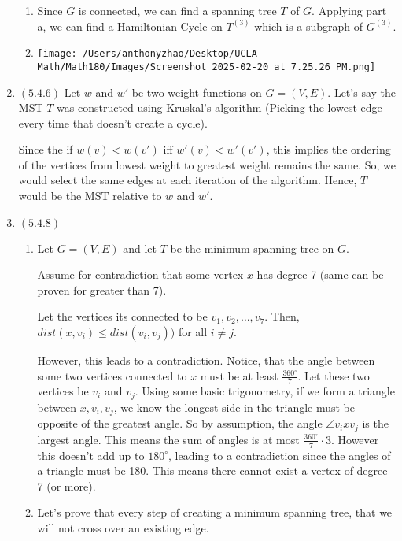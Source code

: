 \documentclass[12pt]{article}
\begin{document}
\begin{enumerate}[start=1,label={\bfseries Problem \arabic*:},leftmargin=1in]
\begin{enumerate}
        \item Since $G$ is connected, we can find a spanning tree $T$ of $G$. Applying part a, we can find a Hamiltonian Cycle on $T^{(3)}$ which is a subgraph of $G^{(3)}$.
        \item \texttt{[image: /Users/anthonyzhao/Desktop/UCLA-Math/Math180/Images/Screenshot 2025-02-20 at 7.25.26 PM.png]}
    \end{enumerate}
    
    \item $(5.4.6)$ Let $w$ and $w'$ be two weight functions on $G = (V, E)$. 
    Let's say the MST $T$ was constructed using Kruskal's algorithm (Picking the lowest edge every time that doesn't create a cycle). 

    Since the if $w(v) < w(v')$ iff $w'(v) < w'(v')$, this implies the ordering of the vertices from lowest weight to greatest weight remains the same. 
    So, we would select the same edges at each iteration of the algorithm. Hence, $T$ would be the MST relative to $w$ and $w'$. 

    \item $(5.4.8)$ 
    \begin{enumerate}
        \item  Let $G = (V, E)$ and let $T$ be the minimum spanning tree on $G$. 
    
        Assume for contradiction that some vertex $x$ has degree 7 (same can be proven for greater than 7).  
        
        Let the vertices its connected to be $v_{1}, v_{2}, \dots, v_{7}$. 
        Then, $dist(x, v_{i}) \leq dist(v_{i}, v_{j}))$ for all $i \neq j$. 
    
        However, this leads to a contradiction. 
        Notice, that the angle between some two vertices connected to $x$ must be at least $\frac{360^{\circ}}{7}$. Let these two vertices be $v_{i}$ and $v_{j}$. 
        Using some basic trigonometry, if we form a triangle between $x, v_{i}, v_{j}$, we know the longest side in the triangle must be opposite of the 
        greatest angle. So by assumption, the angle $\angle v_{i} x v_{j}$ is the largest angle. This means the sum of angles is at most $\frac{360^{\circ}}{7} \cdot 3$. 
        However this doesn't add up to $180^{\circ}$, leading to a contradiction since the angles of a triangle must be 180. This means there cannot exist a vertex of degree 7 (or more). 

        \item Let's prove that every step of creating a minimum spanning tree, that we will not cross over an existing edge. 
        

\end{enumerate}
\end{enumerate}
\end{document}
